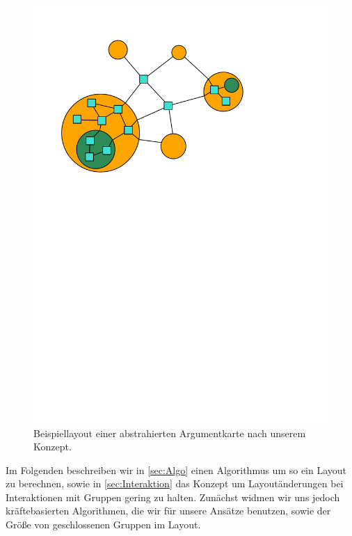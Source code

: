 \begin{figure}[h!]
\begin{center} 
  \includegraphics[width=0.7\linewidth]{Pics/Layoutbeispiel.pdf}
  \caption{Beispiellayout einer abstrahierten Argumentkarte nach unserem Konzept.}
  \label{f:Layoutbeispiel}
\end{center}
\end{figure}

Im Folgenden beschreiben wir  in \autoref{sec:Algo} einen Algorithmus um so ein Layout zu berechnen, 
sowie in \autoref{sec:Interaktion} das Konzept um Layoutänderungen bei Interaktionen mit Gruppen gering zu halten.
Zunächst widmen wir uns jedoch kräftebasierten Algorithmen, die wir für unsere Ansätze benutzen, sowie der Größe von geschlossenen Gruppen im Layout.

